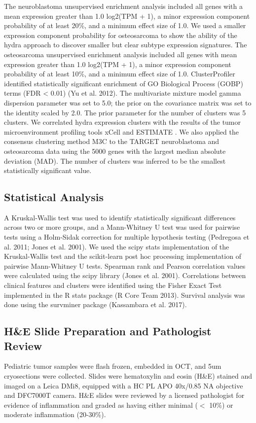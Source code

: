 \documentclass[10pt,letterpaper]{article}
\begin{document}
The neuroblastoma unsupervised enrichment analysis included all genes with a mean expression greater than 1.0 log2(TPM + 1), a minor expression component probability of at least 20\%, and a minimum effect size of 1.0. We used a smaller expression component probability for osteosarcoma to show the ability of the hydra approach to discover smaller but clear subtype expression signatures. The osteosarcoma unsupervised enrichment analysis included all genes with mean expression greater than 1.0 log2(TPM + 1), a minor expression component probability of at least 10\%, and a minimum effect size of 1.0. ClusterProfiler identified statistically significant enrichment of GO Biological Process (GOBP) terms (FDR < 0.01) (Yu et al. 2012). The multivariate mixture model gamma dispersion parameter was set to 5.0; the prior on the covariance matrix was set to the identity scaled by 2.0. The prior parameter for the number of clusters was 5 clusters. We correlated hydra expression clusters with the results of the tumor microenvironment profiling tools xCell \cite{aranXCellDigitallyPortraying2017} and ESTIMATE \cite{yoshiharaInferringTumourPurity2013}. We also applied the consensus clustering method M3C \cite{johnM3CMonteCarlo2018} to the TARGET neuroblastoma and osteosarcoma data using the 5000 genes with the largest median absolute deviation (MAD). The number of clusters was inferred to be the smallest statistically significant value.

\subsection{Statistical Analysis}
A Kruskal-Wallis test was used to identify statistically significant differences across two or more groups, and a Mann-Whitney U test was used for pairwise tests using a Holm-Sidak correction for multiple hypothesis testing (Pedregosa et al. 2011; Jones et al. 2001). We used the scipy stats implementation of the Kruskal-Wallis test and the scikit-learn post hoc processing implementation of pairwise Mann-Whitney U tests. Spearman rank and Pearson correlation values were calculated using the scipy library (Jones et al. 2001). Correlations between clinical features and clusters were identified using the Fisher Exact Test implemented in the R stats package (R Core Team 2013). Survival analysis was done using the survminer package (Kassambara et al. 2017). 

\subsection{H\&E Slide Preparation and Pathologist Review}
Pediatric tumor samples were flash frozen, embedded in OCT, and 5um cryosections were collected. Slides were hematoxylin and eosin (H\&E) stained and imaged on a Leica DMi8, equipped with a HC PL APO 40x/0.85 NA objective and DFC7000T camera. H\&E slides were reviewed by a licensed pathologist for evidence of inflammation and graded as having either minimal ($<$ 10\%) or moderate inflammation (20-30\%).
\end{document}
